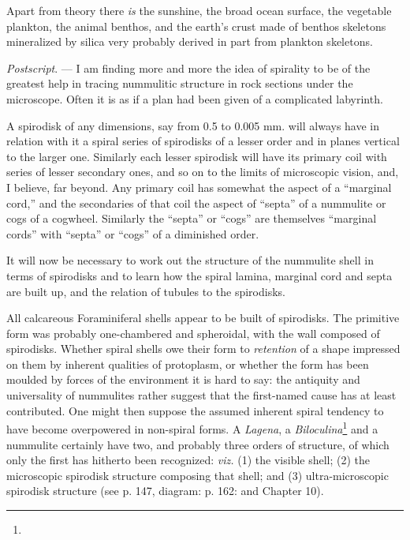\documentclass[a4paper, 12pt, oneside]{article}
\begin{document}
Apart from theory there \emph{is} the sunshine, the broad ocean surface, the vegetable plankton, the animal benthos, and the earth's crust made of benthos skeletons mineralized by silica very probably derived in part from plankton skeletons.

\emph{Postscript}. --- I am finding more and more the idea of spirality to be of the greatest help in tracing nummulitic structure in rock sections under the microscope. Often it is as if a plan had been given of a complicated labyrinth.

A spirodisk of any dimensions, say from 0.5 to 0.005 mm. will always have in relation with it a spiral series of spirodisks of a lesser order and in planes vertical to the larger one. Similarly each lesser spirodisk will have its primary coil with series of lesser secondary ones, and so on to the limits of microscopic vision, and, I believe, far beyond. Any primary coil has somewhat the aspect of a ``marginal cord,'' and the secondaries of that coil the aspect of ``septa'' of a nummulite or cogs of a cogwheel. Similarly the ``septa'' or ``cogs'' are themselves ``marginal cords'' with ``septa'' or ``cogs'' of a diminished order.

It will now be necessary to work out the structure of the nummulite shell in terms of spirodisks and to learn how the spiral lamina, marginal cord and septa are built up, and the relation of tubules to the spirodisks.

All calcareous Foraminiferal shells appear to be built of spirodisks. The primitive form was probably one-chambered and spheroidal, with the wall composed of spirodisks. Whether spiral shells owe their form to \emph{retention} of a shape impressed on them by inherent qualities of protoplasm, or whether the form has been moulded by forces of the environment it is hard to say: the antiquity and universality of nummulites rather suggest that the first-named cause has at least contributed. One might then suppose the assumed inherent spiral tendency to have become overpowered in non-spiral forms. A \emph{Lagena}, a \emph{Biloculina}\footnote{} and a nummulite certainly have two, and probably three orders of structure, of which only the first has hitherto been recognized: \emph{viz.} (1) the visible shell; (2) the microscopic spirodisk structure composing that shell; and (3) ultra-microscopic spirodisk structure (see p. 147, diagram: p. 162: and Chapter 10).
\clearpage
\end{document}
